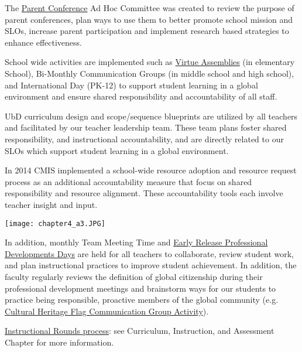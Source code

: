 \begin{findings}
The \href{https://docs.google.com/a/cmis.ac.th/presentation/d/1wta0iJ57lCPiV0uJm9plaDBeCSll-VbBkMQUeGwpons/edit?usp=sharing}{Parent Conference} Ad Hoc Committee was created to review the purpose of parent conferences, plan ways to use them to better promote school mission and SLOs, increase parent participation and implement research based strategies to enhance effectiveness.

School wide activities are implemented such as \href{https://docs.google.com/a/cmis.ac.th/document/d/1Mv1xjTpbY36naur8SDt9GanKNfR7YtYVL-bWwGLPSHo/edit?usp=sharing}{Virtue Assemblies} (in elementary School), Bi-Monthly Communication Groups (in middle school and high school), and International Day (PK-12) to support student learning in a global environment and ensure shared responsibility and accountability of all staff.

UbD curriculum design and scope/sequence blueprints are utilized by all teachers and facilitated by our teacher leadership team. These team plans foster shared responsibility, and instructional accountability, and are directly related to our SLOs which support student learning in a global environment. 

In 2014 CMIS implemented a school-wide resource adoption and resource request process as an additional accountability measure that focus on shared responsibility and resource alignment. These accountability tools each involve teacher insight and input. 


{\centering\texttt{[image: chapter4\_a3.JPG]}}



In addition, monthly Team Meeting Time and \href{https://docs.google.com/document/d/1tSEBD59kwf83Z0-m1Q4hzNrVwaJMHdracrghwqoSdW0/edit?ts=589d238c}{Early Release Professional Developments Days} are held for all teachers to collaborate, review student work, and plan instructional practices to improve student achievement. In addition, the faculty regularly reviews the definition of global citizenship during their professional development meetings and brainstorm ways for our students to practice being responsible, proactive members of the global community (e.g. \href{https://docs.google.com/a/cmis.ac.th/document/d/1fJmuufIbXlGt7DGAuQ3OBW00VdOY_1QgqLzgEpmxdKQ/edit?usp=sharing}{Cultural Heritage Flag Communication Group Activity}).

\href{https://docs.google.com/document/d/1eDtOzhe_JnpVQmEIoF-IO0ejVrDalm8s0i6PaiDl9hs/edit}{Instructional Rounds process}: see Curriculum, Instruction, and Assessment Chapter for more information. 


\end{findings}
